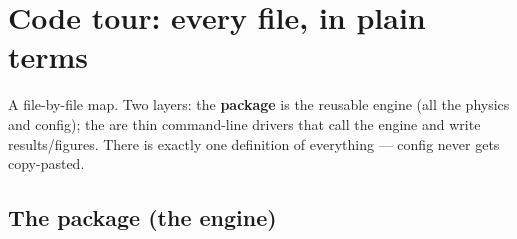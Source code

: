 \section{Code tour: every file, in plain terms}
\label{sec:codetour}

A file-by-file map. Two layers: the \textbf{ package} is the
reusable engine (all the physics and config); the \textbf{} are
thin command-line drivers that call the engine and write results/figures. There
is exactly one definition of everything --- config never gets copy-pasted.

\subsection{The  package (the engine)}

